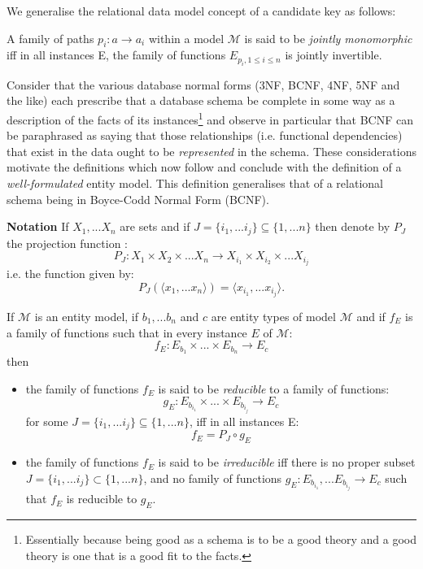\documentclass[10pt,a4paper]{article}
\newcommand{\term}[1]{\textit{{#1}}}
\newcommand{\genericmodel}{\mathcal{M}}
\begin{document}
\noindent We generalise the relational data model concept of a candidate key as follows:

\begin{definition}
A family of paths $p_i: a \rightarrow a_i$ within a model $\genericmodel$ is said to be \term{jointly monomorphic} iff in all instances E,
the family of functions 
$E_{p_i, 1 \leq i \leq n}$  is jointly invertible. 
\end{definition}

\noindent
Consider that the various database normal forms (3NF, BCNF, 4NF, 5NF and the like) each 
prescribe that a database schema be complete in some way as a description of the facts of its instances\footnote{Essentially
 because being good as a schema is to be a good theory and a good theory is one that is a good fit to the facts.} and observe 
in particular that BCNF can be paraphrased as saying that those relationships (i.e. functional dependencies) that exist in the data ought to be \term{represented} in the schema. These considerations motivate the definitions which now follow and conclude with the definition of a \term{well-formulated} entity model. This definition generalises that of a relational schema being in Boyce-Codd Normal Form (BCNF). 
   
\noindent \textbf{Notation}
If $X_1,...X_n$ are sets and if $J=\{i_1,...i_j\} \subseteq \{1,...n\}$ then denote by $P_J$ the projection function :
$$
P_J : X_1 \times X_2 \times ...X_n \rightarrow X_{i_1} \times X_{i_2} \times ... X_{i_j}
$$
\noindent i.e. the function given by:
$$
P_J(\langle x_1,...x_n \rangle ) = \langle x_{i_1},...x_{i_j} \rangle.
$$

\begin{definition}
If $\genericmodel$ is an entity model, if $b_1,...b_n$ and $c$ are entity types of model $\genericmodel$  and if $f_E$ is a family of functions 
such that in every instance $E$ of $\genericmodel$:
$$
f_E : E_{b_1} \times ... \times E_{b_n} \rightarrow E_c
$$
then 
\begin {itemize}
\item{the family of functions $f_E$ is said to be \term{reducible} to a family of functions:
$$
g_E : E_{b_{i_1}} \times ... \times E_{b_{i_j}} \rightarrow E_c
$$
for some $J=\{i_1,...i_j\} \subseteq \{1,...n\}$, iff in all instances E:
$$
f_E = P_J \circ g_E
$$
}
\item{
the family of functions $f_E$ is said to be \term{irreducible} iff there is no proper subset
 $J=\{i_1,...i_j\} \subset \{1,...n\}$, and no family of functions 
$g_E : E_{b_{i_1}},...E_{b_{i_j}} \rightarrow E_c$ such that $f_E$ is reducible to $g_E$.
}
\end{itemize}
\end{definition}
\end{document}
